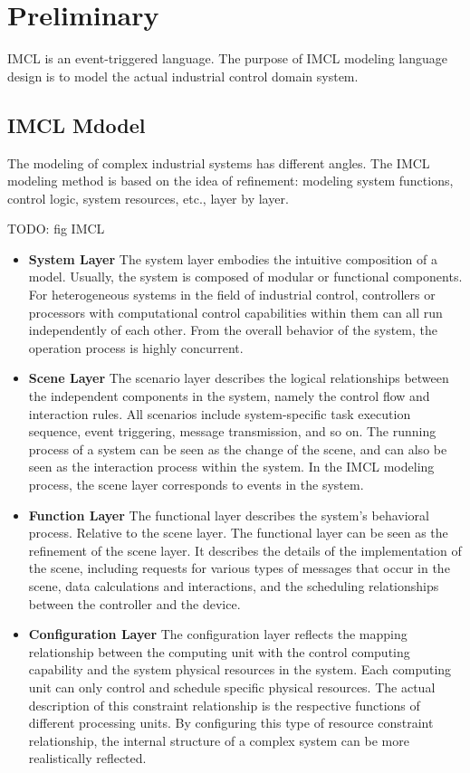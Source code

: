 \section{Preliminary}
IMCL is an event-triggered language. 
The purpose of IMCL modeling language design is to model the actual industrial control domain system.


\subsection{IMCL Mdodel}
The modeling of complex industrial systems has different angles.
The IMCL modeling method is based on the idea of refinement: modeling system functions, control logic, system resources, etc., layer by layer.


TODO: fig IMCL

\begin{itemize}
  \item \textbf{System Layer} The system layer embodies the intuitive composition of a model. Usually, the system is composed of modular or functional components. For heterogeneous systems in the field of industrial control, controllers or processors with computational control capabilities within them can all run independently of each other. From the overall behavior of the system, the operation process is highly concurrent.
  \item \textbf{Scene Layer} The scenario layer describes the logical relationships between the independent components in the system, namely the control flow and interaction rules. All scenarios include system-specific task execution sequence, event triggering, message transmission, and so on. The running process of a system can be seen as the change of the scene, and can also be seen as the interaction process within the system. In the IMCL modeling process, the scene layer corresponds to events in the system.
  \item \textbf{Function Layer} The functional layer describes the system's behavioral process. Relative to the scene layer. The functional layer can be seen as the refinement of the scene layer. It describes the details of the implementation of the scene, including requests for various types of messages that occur in the scene, data calculations and interactions, and the scheduling relationships between the controller and the device.
  \item \textbf{Configuration Layer} The configuration layer reflects the mapping relationship between the computing unit with the control computing capability and the system physical resources in the system. Each computing unit can only control and schedule specific physical resources. The actual description of this constraint relationship is the respective functions of different processing units. By configuring this type of resource constraint relationship, the internal structure of a complex system can be more realistically reflected.
\end{itemize}

